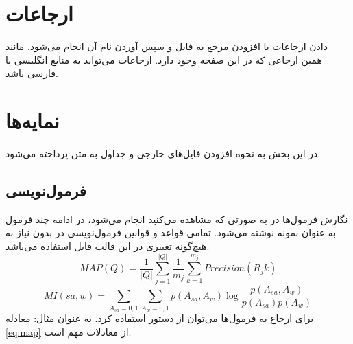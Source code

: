 \section{ارجاعات}
دادن ارجاعات با افزودن  مرجع به فایل  و سپس آوردن نام آن انجام می‌شود. مانند همین ارجاعی که در این صفحه وجود دارد. ارجاعات می‌تواند به منابع انگلیسی\cite{expret} یا فارسی\cite{Vahedi87} باشد.

\section{نمایه‌ها}
در این بخش به نحوه افزودن فایل‌های خارجی و جداول به متن پرداخته می‌شود.
\subsection{فرمول‌نویسی}
نگارش فرمول‌ها در  به صورتی که مشاهده‌ می‌کنید انجام می‌شود، در ادامه چند فرمول به عنوان نمونه نوشته می‌شود. تمامی قواعد و قوانین فرمول‌نویسی در  بدون نیاز به هیچ‌گونه تغییری در این قالب قابل استفاده می‌باشد.
\begin{equation}
MAP(Q) = \frac{1}{|Q|} \sum_{j = 1}^{|Q|}
{
	\frac{1}{m_j} \sum_{k = 1}^{m_j} {Precision(R_jk)}
}
\label{eq:map}
\end{equation}
\begin{equation}
MI(sa,w) = \sum_{ A_{sa} = 0,1}{
	\sum_{A_{w} = 0,1}{
		p(A_{sa} , A_{w}) \log{\frac{p(A_{sa} , A_{w})}{p(A_{sa}) p(A_{w})}}
	}%
}%
\label{eq:mi}
\end{equation}
برای ارجاع به فرمول‌ها می‌توان از دستور  استفاده کرد. به عنوان مثال: معادله \ref{eq:map} از معادلات مهم است.
